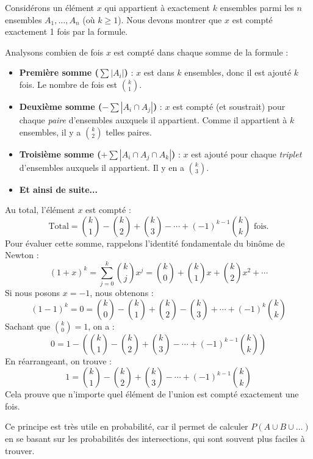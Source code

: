 \begin{proofbox}
Considérons un élément $x$ qui appartient à exactement $k$ ensembles parmi les $n$ ensembles $A_1, \ldots, A_n$ (où $k \ge 1$). Nous devons montrer que $x$ est compté exactement 1 fois par la formule.

Analysons combien de fois $x$ est compté dans chaque somme de la formule :
\begin{itemize}
    \item \textbf{Première somme ($\sum |A_i|$)} : $x$ est dans $k$ ensembles, donc il est ajouté $k$ fois. Le nombre de fois est $\binom{k}{1}$.
    
    \item \textbf{Deuxième somme ($-\sum |A_i \cap A_j|$)} : $x$ est compté (et soustrait) pour chaque \textit{paire} d'ensembles auxquels il appartient. Comme il appartient à $k$ ensembles, il y a $\binom{k}{2}$ telles paires.
    
    \item \textbf{Troisième somme ($+\sum |A_i \cap A_j \cap A_k|$)} : $x$ est ajouté pour chaque \textit{triplet} d'ensembles auxquels il appartient. Il y en a $\binom{k}{3}$.
    
    \item \textbf{Et ainsi de suite...}
\end{itemize}
Au total, l'élément $x$ est compté :
$$ \text{Total} = \binom{k}{1} - \binom{k}{2} + \binom{k}{3} - \cdots + (-1)^{k-1}\binom{k}{k} \text{ fois.} $$
Pour évaluer cette somme, rappelons l'identité fondamentale du binôme de Newton :
$$ (1 + x)^k = \sum_{j=0}^{k} \binom{k}{j} x^j = \binom{k}{0} + \binom{k}{1}x + \binom{k}{2}x^2 + \cdots $$
Si nous posons $x = -1$, nous obtenons :
$$ (1-1)^k = 0 = \binom{k}{0} - \binom{k}{1} + \binom{k}{2} - \binom{k}{3} + \cdots + (-1)^k\binom{k}{k} $$
Sachant que $\binom{k}{0} = 1$, on a :
$$ 0 = 1 - \left( \binom{k}{1} - \binom{k}{2} + \binom{k}{3} - \cdots + (-1)^{k-1}\binom{k}{k} \right) $$
En réarrangeant, on trouve :
$$ 1 = \binom{k}{1} - \binom{k}{2} + \binom{k}{3} - \cdots + (-1)^{k-1}\binom{k}{k} $$
Cela prouve que n'importe quel élément de l'union est compté exactement une fois.
\end{proofbox}

Ce principe est très utile en probabilité, car il permet de calculer $P(A \cup B \cup \dots)$ en se basant sur les probabilités des intersections, qui sont souvent plus faciles à trouver.

